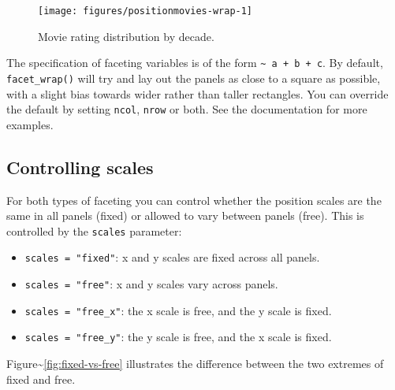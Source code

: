 \begin{figure}
\texttt{[image: figures/positionmovies-wrap-1]} \caption{Movie rating distribution by decade.\label{fig:movies-wrap}}
\end{figure}

The specification of faceting variables is of the form
\texttt{\textasciitilde{} a + b + c}. By default, \texttt{facet\_wrap()}
will try and lay out the panels as close to a square as possible, with a
slight bias towards wider rather than taller rectangles. You can
override the default by setting \texttt{ncol}, \texttt{nrow} or both.
See the documentation for more examples.

\subsection{Controlling scales}\label{sub:controlling-scales}

For both types of faceting you can control whether the position scales
are the same in all panels (fixed) or allowed to vary between panels
(free). This is controlled by the \texttt{scales} parameter:

\begin{itemize}
\itemsep1pt\parskip0pt
\item
  \texttt{scales = "fixed"}: x and y scales are fixed across all panels.
\item
  \texttt{scales = "free"}: x and y scales vary across panels.
\item
  \texttt{scales = "free\_x"}: the x scale is free, and the y scale is
  fixed.
\item
  \texttt{scales = "free\_y"}: the y scale is free, and the x scale is
  fixed.
\end{itemize}

\noindent Figure\textasciitilde{}\ref{fig:fixed-vs-free} illustrates the
difference between the two extremes of fixed and free.

\begin{Shaded}
\begin{Highlighting}[]
\StringTok{ } 
\StringTok{ }\NormalTok{(~}\StringTok{ }
\StringTok{ }\NormalTok{(~}\StringTok{ } \NormalTok{)}
\end{Highlighting}
\end{Shaded}

